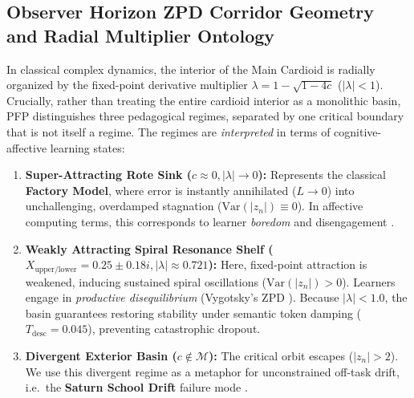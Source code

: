 \documentclass[10pt,twocolumn,a4paper]{article}
\begin{document}
\subsection{Observer Horizon ZPD Corridor Geometry and Radial Multiplier Ontology}
In classical complex dynamics, the interior of the Main Cardioid is radially organized by the fixed-point derivative multiplier $\lambda = 1 - \sqrt{1 - 4c}$ ($|\lambda| < 1$). Crucially, rather than treating the entire cardioid interior as a monolithic basin, PFP distinguishes three pedagogical regimes, separated by one critical boundary that is not itself a regime. The regimes are \emph{interpreted} in terms of cognitive-affective learning states:
\begin{enumerate}[leftmargin=*,nosep]
    \item \textbf{Super-Attracting Rote Sink ($c \approx 0, |\lambda| \to 0$):} Represents the classical \textbf{Factory Model}, where error is instantly annihilated ($L \to 0$) into unchallenging, overdamped stagnation ($\text{Var}(|z_n|) \equiv 0$). In affective computing terms, this corresponds to learner \textit{boredom} and disengagement \cite{baker2010better}.
    \item \textbf{Weakly Attracting Spiral Resonance Shelf ($X_{\text{upper/lower}} = 0.25 \pm 0.18i, |\lambda| \approx 0.721$):} Here, fixed-point attraction is weakened, inducing sustained spiral oscillations ($\text{Var}(|z_n|) > 0$). Learners engage in \textit{productive disequilibrium} (Vygotsky's ZPD \cite{vygotsky1978mind}). Because $|\lambda| < 1.0$, the basin guarantees restoring stability under semantic token damping ($T_{\text{desc}} = 0.045$), preventing catastrophic dropout.
    \item \textbf{Divergent Exterior Basin ($c \notin \mathcal{M}$):} The critical orbit escapes ($|z_n| > 2$). We use this divergent regime as a metaphor for unconstrained off-task drift, i.e.\ the \textbf{Saturn School Drift} failure mode \cite{bennett1991saturn,reigeluth2008chaos}.
\end{enumerate}
\end{document}
